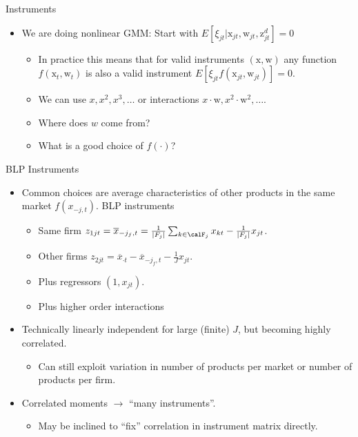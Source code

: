 \begin{frame}{Instruments}
\begin{itemize}
\item We are doing nonlinear GMM: Start with $E[\xi_{jt} | \mathrm{x}_{jt}, \mathrm{w}_{jt},\mathrm{z}_{jt}^d]=0$
\begin{itemize}
\item In practice this means that for valid instruments $(\mathrm{x},\mathrm{w})$ any function $f(\mathrm{x}_t,\mathrm{w}_t)$ is also a valid instrument $E[ \xi_{jt} f(\mathrm{x}_{jt},\mathrm{w}_{jt})]=0$.
\item We can use $x, x^2, x^3,\ldots$ or interactions $x \cdot \mathrm{w}, x^2 \cdot \mathrm{w}^2, \ldots$.
\item Where does $w$ come from?
\item What is a good choice of $f(\cdot)$?
\end{itemize}
\end{itemize}
\end{frame}


\begin{frame}{BLP Instruments}
\begin{itemize}
\item Common choices are average characteristics of other products in the same market $f(x_{-j,t})$. \alert{BLP instruments}
\begin{itemize}
\item Same firm $z_{1jt} = \overline{x}_{-j_f,t} = \frac{1}{\left\vert{F_j}\right\vert}  \sum_{k \in \calF_j} x_{kt} - \frac{1}{\left\vert{F_j}\right\vert} x_{jt}$.
\item Other firms $z_{2jt}=\overline{x}_{\cdot t} - \overline{x}_{-j_f,t} - \frac{1}{J} x_{jt}$.
\item Plus regressors $(1, x_{jt})$.
\item Plus higher order interactions 
\end{itemize}
\item Technically linearly independent for large (finite) $J$, but becoming highly correlated.
\begin{itemize}
\item Can still exploit variation in number of products per market or number of products per firm.
\end{itemize}
\item Correlated moments $\rightarrow$ ``many instruments''.
\begin{itemize}
\item May be inclined to ``fix'' correlation in instrument matrix directly.
\end{itemize}
\end{itemize}
\end{frame}


